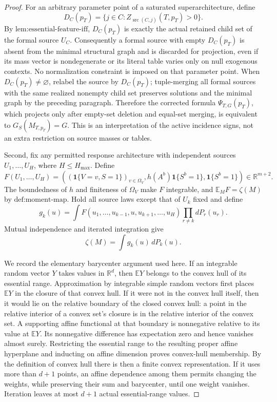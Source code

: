 \documentclass{article}
\begin{document}
\begin{proof}
For an arbitrary parameter point of a saturated superarchitecture, define
\[
D_C(p_T)=\{j\in C:Z_{\operatorname{src}(C,j)}(T,p_T)>0\}.
\]
By \(\text{lem:essential-feature-iff}\), \(D_C(p_T)\) is exactly the actual retained child set of the formal source \(U_C\).  Consequently a formal source with empty \(D_C(p_T)\) is absent from the minimal structural graph and is discarded for projection, even if its mass vector is nondegenerate or its literal table varies only on null exogenous contexts.  No normalization constraint is imposed on that parameter point.  When \(D_C(p_T)\ne\varnothing\), relabel the source by \(D_C(p_T)\); tuple-merging all formal sources with the same realized nonempty child set preserves solutions and the minimal graph by the preceding paragraph.  Therefore the corrected formula \(\Psi_{T,G}(p_T)\), which projects only after empty-set deletion and equal-set merging, is equivalent to \(G_S(M_{T,p_T})=G\).  This is an interpretation of the active incidence signs, not an extra restriction on source masses or tables.

Second, fix any permitted response architecture with independent sources \(U_1,\ldots,U_H\), where \(H\leq H_{\max}\).  Define
\[
F(U_1,\ldots,U_H)=
\left(
  (\mathbf 1\{V=v,S=1\})_{v\in\Omega_V},
  h(A^b)\mathbf 1\{S^b=1\},
  \mathbf 1\{S^b=1\}
\right)\in\mathbb R^{m+2}.
\]
The boundedness of \(h\) and finiteness of \(\Omega_V\) make \(F\) integrable, and \(\mathbb E_M F=\zeta(M)\) by \(\text{def:moment-map}\).  Hold all source laws except that of \(U_k\) fixed and define
\[
g_k(u)=
\int F(u_1,\ldots,u_{k-1},u,u_{k+1},\ldots,u_H)
      \prod_{r\ne k}dP_r(u_r).
\]
Mutual independence and iterated integration give
\[
\zeta(M)=\int g_k(u)\,dP_k(u).
\]

We record the elementary barycenter argument used here.  If an integrable random vector \(Y\) takes values in \(\mathbb R^d\), then \(\mathbb EY\) belongs to the convex hull of its essential range.  Approximation by integrable simple random vectors first places \(\mathbb EY\) in the closure of that convex hull.  If it were not in the convex hull itself, then it would lie on the relative boundary of the closed convex hull: a point in the relative interior of a convex set's closure is in the relative interior of the convex set.  A supporting affine functional at that boundary is nonnegative relative to its value at \(\mathbb EY\).  Its nonnegative difference has expectation zero and hence vanishes almost surely.  Restricting the essential range to the resulting proper affine hyperplane and inducting on affine dimension proves convex-hull membership.  By the definition of convex hull there is then a finite convex representation.  If it uses more than \(d+1\) points, an affine dependence among them permits changing the weights, while preserving their sum and barycenter, until one weight vanishes.  Iteration leaves at most \(d+1\) actual essential-range values.


\end{proof}
\end{document}
